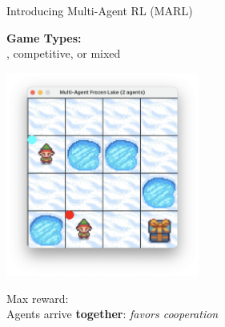 \documentclass[aspectratio=169,xcolor=dvipsnames]{beamer}
\begin{document}
\begin{frame}{Introducing Multi-Agent RL (MARL)}

\textbf{Game Types:} \\
, competitive, or mixed

\vspace{1em}

\begin{minipage}[T]{0.6\textwidth}
    \vspace{-10pt}
    \href{https://github.com/edabier/MARL-project/blob/main/game_gif/centralized-2-agent-coop.gif}{\includegraphics[height=6.7cm]{images/multi-agent.png}}
\end{minipage}
\hspace{-50pt}
\begin{minipage}[T]{0.5\textwidth}
    \vspace{-100pt} %
    \begin{block}{Max reward:} \\
    Agents arrive \textbf{together}: \textit{favors cooperation}
    \end{block}
\end{minipage}

\end{frame}

\end{document}
